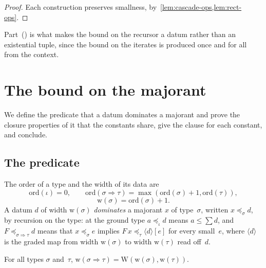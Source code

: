 \documentclass[11pt]{amsart}
\makeatletter
\newcommand{\gr}{\iota}                      %
\newcommand{\arr}{\Rightarrow}
\newcommand{\ord}{\mathrm{ord}}
\newcommand{\dwd}{\mathrm{w}}
\newcommand{\W}{\mathrm{W}}
\newcommand{\tsum}[1]{\textstyle\sum #1}
\newcommand{\dom}{\mathrel{\preccurlyeq}}     %
\newcommand{\act}[2]{#1[#2]}                  %
\newcommand{\rd}[1]{\langle #1 \rangle}       %
\newif\ifagdarefs
\newcommand{\AgdaRefs}[1]{\ifagdarefs{\footnotesize\color{agdablue}(#1)}\else\unskip\fi}
\newcommand{\Agda}[2]{{\footnotesize\color{agdablue}\textsf{#1}%
  \ifblank{#2}{}{\texttt{.}\allowbreak\texttt{#2}}}}
\let\ttt@plain\texttt
\renewcommand{\texttt}[1]{{\footnotesize\color{agdablue}\ttt@plain{#1}}}
\theoremstyle{plain}
\theoremstyle{definition}
\makeatother
\begin{document}
\begin{proof}
Each construction preserves smallness,
by~\cref{lem:cascade-ops,lem:rect-ops}.
\AgdaRefs{\Agda{BrouwerOrdinals.RectApply}{ssh}; \texttt{valSc-ssh},
\texttt{ssh-All<}, \texttt{rect-preRD};
\Agda{BrouwerOrdinals.RectCurry}{scurryD}, \texttt{valSc-scurry},
\texttt{tsum-cmb-⋖}, \texttt{scurryD-All<};
\Agda{BrouwerOrdinals.RectOrbitAct}{rtail-iter}, \texttt{orbEI},
\texttt{orbEI-All<}, \texttt{rorbitD-All<}.}
\end{proof}

Part~() is what makes the bound on the recursor
a datum rather than an existential tuple, since the bound on the
iterates is produced once and for all from the context.

\section{The bound on the majorant}
\label{sec:bound}

We define the predicate that a datum dominates a majorant and prove
the closure properties of it that the constants share, give the clause
for each constant, and conclude.

\subsection{The predicate}
\label{sec:predicate}

\begin{definition}
\label{def:dom}
The order of a type and the width of its data are
\[
  \ord(\gr) = 0 , \qquad
  \ord(\sigma\arr\tau) = \max(\ord(\sigma)+1, \ord(\tau)) ,
\]
\[
  \dwd(\sigma) = \ord(\sigma)+1 .
\]
A datum $d$ of width $\dwd(\sigma)$ \emph{dominates} a majorant $x$ of
type~$\sigma$, written $x \dom_{\sigma} d$, by recursion on the type:
at the ground type $a \dom_{\gr} d$ means $a \le \tsum d$, and
$F \dom_{\sigma\arr\tau} d$ means that
$x \dom_{\sigma} e$ implies $F\,x \dom_{\tau} \act{\rd d}{e}$ for
every small~$e$, where $\rd d$ is the graded map from width
$\dwd(\sigma)$ to width $\dwd(\tau)$ read off~$d$.
\AgdaRefs{\Agda{DialogueTrees.Predicate}{ord}; \texttt{wd},
\texttt{Dom}.}
\end{definition}

\begin{lemma}
\label{lem:widths}
For all types $\sigma$ and~$\tau$,
$\dwd(\sigma\arr\tau) = \W(\dwd(\sigma), \dwd(\tau))$.
\AgdaRefs{The two sides are definitionally equal, which is what lets
the arrow clause of \Agda{DialogueTrees.Predicate}{Dom} type check
with no coercion, so there is no separate lemma to cite.}
\end{lemma}
\end{document}
